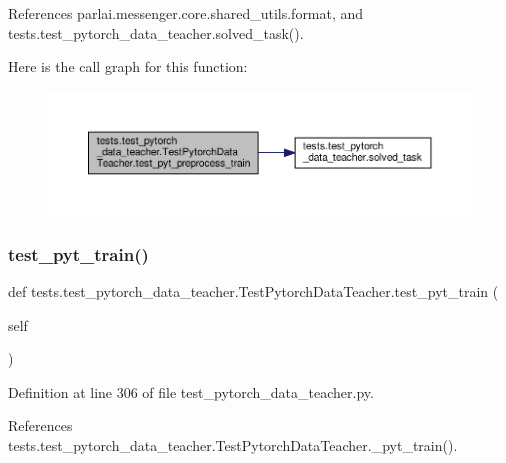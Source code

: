 References parlai.\+messenger.\+core.\+shared\+\_\+utils.\+format, and tests.\+test\+\_\+pytorch\+\_\+data\+\_\+teacher.\+solved\+\_\+task().

Here is the call graph for this function\+:
\nopagebreak
\begin{figure}[H]
\begin{center}
\leavevmode
\includegraphics[width=350pt]{classtests_1_1test__pytorch__data__teacher_1_1TestPytorchDataTeacher_a3ba46374c7e9068827af1b90f35c832e_cgraph}
\end{center}
\end{figure}
\mbox{\label{classtests_1_1test__pytorch__data__teacher_1_1TestPytorchDataTeacher_a4321d4b1619bf66a94146e811d869185}} 
\subsubsection{\texorpdfstring{test\+\_\+pyt\+\_\+train()}{test\_pyt\_train()}}
{\footnotesize\ttfamily def tests.\+test\+\_\+pytorch\+\_\+data\+\_\+teacher.\+Test\+Pytorch\+Data\+Teacher.\+test\+\_\+pyt\+\_\+train (\begin{DoxyParamCaption}\item[{}]{self }\end{DoxyParamCaption})}



Definition at line 306 of file test\+\_\+pytorch\+\_\+data\+\_\+teacher.\+py.



References tests.\+test\+\_\+pytorch\+\_\+data\+\_\+teacher.\+Test\+Pytorch\+Data\+Teacher.\+\_\+pyt\+\_\+train().


